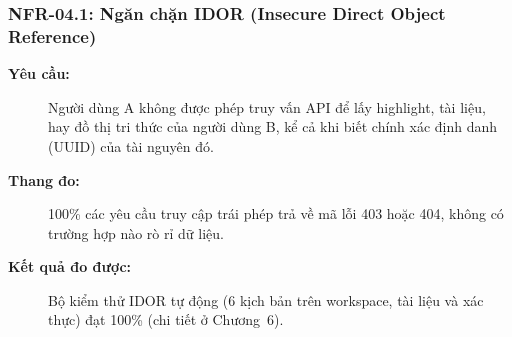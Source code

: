 \subsubsection{NFR-04.1: Ngăn chặn IDOR (Insecure Direct Object Reference)}
\begin{description}
    \item[\textbf{Yêu cầu:}] Người dùng A không được phép truy vấn API để lấy highlight, tài liệu, hay đồ thị tri thức của người dùng B, kể cả khi biết chính xác định danh (UUID) của tài nguyên đó.
    \item[\textbf{Thang đo:}] 100\% các yêu cầu truy cập trái phép trả về mã lỗi 403 hoặc 404, không có trường hợp nào rò rỉ dữ liệu.
    \item[\textbf{Kết quả đo được:}] Bộ kiểm thử IDOR tự động (6 kịch bản trên workspace, tài liệu và xác thực) đạt 100\% (chi tiết ở Chương~6).
\end{description}
